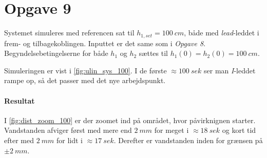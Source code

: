 \section{Opgave 9}
	Systemet simuleres med referencen sat til $h_{1,set} = 100~cm$, både med
	\emph{lead}-leddet i frem- og tilbagekoblingen. Inputtet er det same som i
	\emph{Opgave 8}. Begyndelsebetingelserne for både $h_1$ og $h_2$ sættes til
	$h_1(0) = h_2(0) = 100~cm$.
	
	Simuleringen er vist i \ref{fig:ulin_sys_100}. I de første $\approx 100~sek$
	ser man \emph{I}-leddet rampe op, så det passer med det nye arbejdspunkt.
	
\paragraph{Resultat}
	I \ref{fig:dist_zoom_100} er der zoomet ind på området, hvor påvirknignen
	starter. Vandstanden afviger først med mere end $2~mm$ for meget i $\approx
	18~sek$ og kort tid efter med $2~mm$ for lidt i $\approx
	17~sek$. Derefter er vandstanden inden for grænsen på $\pm 2~mm$.
	

